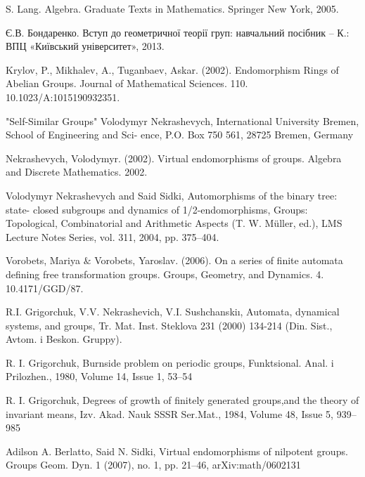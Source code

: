 \documentclass[a4paper,12pt]{amsart}
\theoremstyle{definition}
\begin{document}
	\begin{thebibliography}{9}
		
		
		 S. Lang.
		Algebra. Graduate Texts in Mathematics. Springer New York, 2005.	
	
		Є.В. Бондаренко. Вступ до геометричної теорії груп: навчальний посібник – К.: ВПЦ
		«Київський університет», 2013.
		
		Krylov, P., Mikhalev, A., Tuganbaev, Askar. (2002). Endomorphism Rings of Abelian Groups. Journal of Mathematical Sciences. 110. 10.1023/A:1015190932351. 
		
		 "Self-Similar Groups" Volodymyr Nekrashevych,
		International University Bremen, School of Engineering and Sci-
		ence, P.O. Box 750 561, 28725 Bremen, Germany
		
		 Nekrashevych, Volodymyr. (2002). Virtual endomorphisms of groups. Algebra and Discrete Mathematics. 2002. 
		
		Volodymyr Nekrashevych and Said Sidki, Automorphisms of the binary tree: state-
		closed subgroups and dynamics of 1/2-endomorphisms, Groups: Topological, Combinatorial and Arithmetic Aspects (T. W. Müller, ed.), LMS Lecture Notes Series, vol.
		311, 2004, pp. 375–404.
		
		 Vorobets, Mariya $\&$ Vorobets, Yaroslav. (2006). On a series of finite automata defining free transformation groups. Groups, Geometry, and Dynamics. 4. 10.4171/GGD/87. 
		
		R.I. Grigorchuk, V.V. Nekrashevich, V.I. Sushchanskiı, Automata, dynamical systems, and groups, Tr. Mat. Inst. Steklova 231 (2000) 134-214
		(Din. Sist., Avtom. i Beskon. Gruppy).
		
		 R. I. Grigorchuk, Burnside problem on periodic groups, Funktsional. Anal. i Prilozhen., 1980,
		Volume 14, Issue 1, 53–54
		
		 R. I. Grigorchuk, Degrees of growth of finitely generated groups,and the theory of invariant means, Izv. Akad. Nauk SSSR Ser.Mat., 1984, Volume 48, Issue 5, 939–985
		
		Adilson A. Berlatto, Said N. Sidki, Virtual endomorphisms of nilpotent groups. Groups Geom. Dyn. 1 (2007), no. 1, pp. 21–46, arXiv:math/0602131
		

\end{thebibliography}
\end{document}
